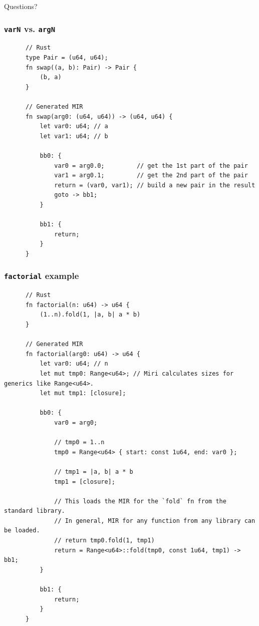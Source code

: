 \documentclass{beamer}
\begin{document}
\begin{frame}
  \begin{center}
    \LARGE{Questions?}
  \end{center}
\end{frame}


\begin{frame}[fragile]
  \frametitle{\texttt{varN} vs. \texttt{argN}}
  \begin{center}
    \begin{verbatim}
      // Rust
      type Pair = (u64, u64);
      fn swap((a, b): Pair) -> Pair {
          (b, a)
      }

      // Generated MIR
      fn swap(arg0: (u64, u64)) -> (u64, u64) {
          let var0: u64; // a
          let var1: u64; // b

          bb0: {
              var0 = arg0.0;         // get the 1st part of the pair
              var1 = arg0.1;         // get the 2nd part of the pair
              return = (var0, var1); // build a new pair in the result
              goto -> bb1;
          }

          bb1: {
              return;
          }
      }
    \end{verbatim}
  \end{center}
\end{frame}

\begin{frame}[fragile]
  \frametitle{\texttt{factorial} example}
  \begin{center}
    \begin{verbatim}
      // Rust
      fn factorial(n: u64) -> u64 {
          (1..n).fold(1, |a, b| a * b)
      }

      // Generated MIR
      fn factorial(arg0: u64) -> u64 {
          let var0: u64; // n
          let mut tmp0: Range<u64>; // Miri calculates sizes for generics like Range<u64>.
          let mut tmp1: [closure];

          bb0: {
              var0 = arg0;

              // tmp0 = 1..n
              tmp0 = Range<u64> { start: const 1u64, end: var0 };

              // tmp1 = |a, b| a * b
              tmp1 = [closure];

              // This loads the MIR for the `fold` fn from the standard library.
              // In general, MIR for any function from any library can be loaded.
              // return tmp0.fold(1, tmp1)
              return = Range<u64>::fold(tmp0, const 1u64, tmp1) -> bb1;
          }

          bb1: {
              return;
          }
      }
    \end{verbatim}
  \end{center}
\end{frame}
\end{document}
